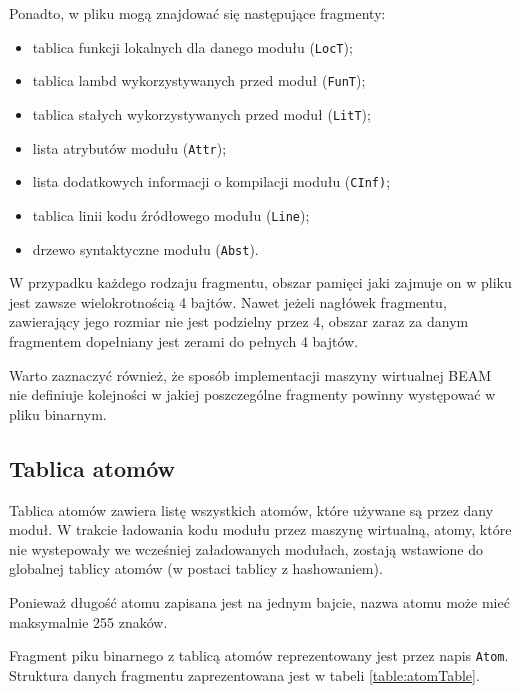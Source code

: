 Ponadto, w pliku mogą znajdować się następujące fragmenty:
\begin{itemize}
\item tablica funkcji lokalnych dla danego modułu (\texttt{LocT});
\item tablica lambd wykorzystywanych przed moduł (\texttt{FunT});
\item tablica stałych wykorzystywanych przed moduł (\texttt{LitT});
\item lista atrybutów modułu (\texttt{Attr});
\item lista dodatkowych informacji o kompilacji modułu (\texttt{CInf)};
\item tablica linii kodu źródłowego modułu (\texttt{Line});
\item drzewo syntaktyczne modułu (\texttt{Abst}).
\end{itemize}

W przypadku każdego rodzaju fragmentu, obszar pamięci jaki zajmuje on w pliku jest zawsze wielokrotnością 4 bajtów. Nawet jeżeli nagłówek fragmentu, zawierający jego rozmiar nie jest podzielny przez 4, obszar zaraz za danym fragmentem dopełniany jest zerami do pełnych 4 bajtów.

Warto zaznaczyć również, że sposób implementacji maszyny wirtualnej BEAM nie definiuje kolejności w jakiej poszczególne fragmenty powinny występować w pliku binarnym.

\subsection{Tablica atomów}
Tablica atomów zawiera listę wszystkich atomów, które używane są przez dany moduł. W trakcie ładowania kodu modułu przez maszynę wirtualną, atomy, które nie wystepowały we wcześniej załadowanych modułach, zostają wstawione do globalnej tablicy atomów (w postaci tablicy z hashowaniem).

Ponieważ długość atomu zapisana jest na jednym bajcie, nazwa atomu może mieć maksymalnie 255 znaków.

Fragment piku binarnego z tablicą atomów reprezentowany jest przez napis \texttt{Atom}. Struktura danych fragmentu zaprezentowana jest w tabeli \ref{table:atomTable}.


